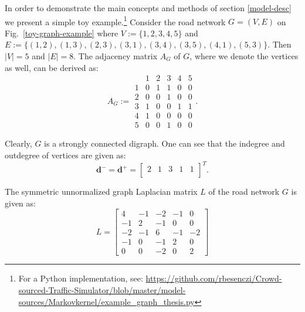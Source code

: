 \documentclass[b5paper,12pt]{report}
\theoremstyle{definition}
\newcommand{\bd}{\boldsymbol{d}}
\begin{document}
In order to demonstrate the main concepts and methods of section \ref{model-desc} we present a simple toy example.\footnote{For a Python implementation, see: \url{https://github.com/rbesenczi/Crowd-sourced-Traffic-Simulator/blob/master/model-sources/Markovkernel/example_graph_thesis.py}} Consider the road network $G=(V,E)$ on Fig.~\ref{toy-graph-example} where $V := \{1, 2, 3, 4, 5\}$ and \\$E := \{(1, 2), (1, 3), (2, 3), (3, 1), (3, 4), (3, 5), (4, 1), (5, 3)\}$. Then $|V| = 5$ and $|E| = 8$. The adjacency matrix $A_G$ of $G$, where we denote the vertices as well, can be derived as:
\[ A_G := \begin{array}{c|ccccc}
 & 1 & 2 & 3 & 4 & 5 \\
 \hline
1 & 0 & 1 & 1 & 0 & 0 \\
2 & 0 & 0 & 1 & 0 & 0 \\
3 & 1 & 0 & 0 & 1 & 1 \\
4 & 1 & 0 & 0 & 0 & 0 \\
5 & 0 & 0 & 1 & 0 & 0
\end{array}.\] 

Clearly, $G$ is a strongly connected digraph. One can see that the indegree and outdegree of vertices are given as:
\[ 
\bd^{−} = \bd^{+} = \left[ \begin{array}{ccccc}
2 & 1 & 3 & 1 & 1 \\
\end{array} \right]^T. 
\]

The symmetric unnormalized graph Laplacian matrix $L$ of the road network $G$ is given as:
\begin{equation*}
L = \begin{bmatrix} 4 & -1 & -2 & -1 & 0 \\  
     -1 & 2 &-1 & 0 & 0 \\ 
     -2 &-1 & 6 &-1 & -2 \\
    -1 & 0 &-1 & 2 & 0 \\
     0 & 0 & -2 & 0 & 2 \end{bmatrix}
\end{equation*}
\end{document}
